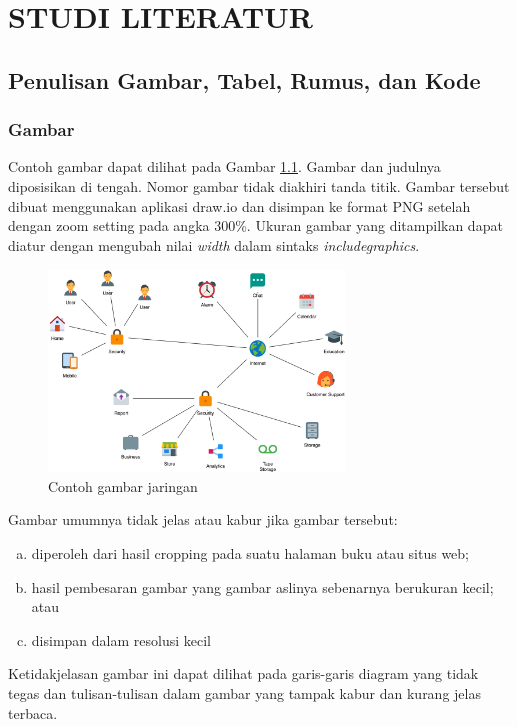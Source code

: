 \documentclass[12pt,a4paper,oneside]{book}
\begin{document}
\chapter{STUDI LITERATUR}
\section{Penulisan Gambar, Tabel, Rumus, dan Kode}
\lipsum[1]

\subsection{Gambar}
Contoh gambar dapat dilihat pada Gambar \ref{gambar:jaringan}. Gambar dan judulnya diposisikan di tengah. Nomor gambar tidak diakhiri tanda titik. Gambar tersebut dibuat menggunakan aplikasi draw.io dan disimpan ke format PNG setelah dengan zoom setting pada angka 300\%. Ukuran gambar yang ditampilkan dapat diatur dengan mengubah nilai \textit{width} dalam sintaks \textit{includegraphics}.

\begin{figure}[t] %
	\centering
  \captionsetup{justification=centering}
    	\includegraphics[width=0.7\textwidth]{gambar1.png}
	\caption{Contoh gambar jaringan}
	\label{gambar:jaringan}
\end{figure}

Gambar umumnya tidak jelas atau kabur jika gambar tersebut:
\begin{enumerate}[a.]
  \item diperoleh dari hasil cropping pada suatu halaman buku atau situs web;
  \item hasil pembesaran gambar yang gambar aslinya sebenarnya berukuran kecil; atau
  \item disimpan dalam resolusi kecil
\end{enumerate}
Ketidakjelasan gambar ini dapat dilihat pada garis-garis diagram yang tidak tegas dan tulisan-tulisan dalam gambar yang tampak kabur dan kurang jelas terbaca.
\end{document}
